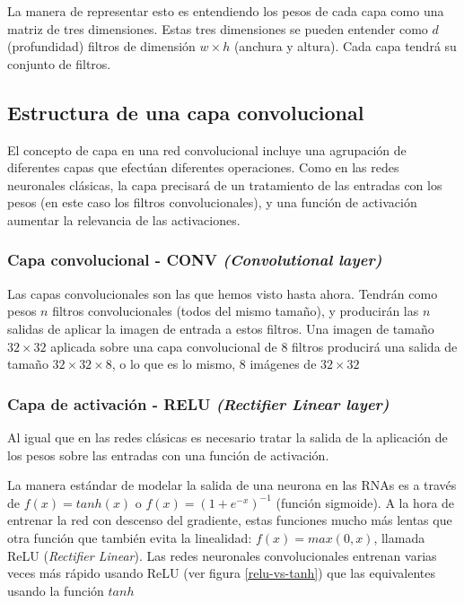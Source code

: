 La manera de representar esto es entendiendo los pesos de cada capa como una matriz de tres dimensiones. Estas tres dimensiones se pueden entender como $d$ (profundidad) filtros de dimensión  $w \times h$ (anchura y altura). Cada capa tendrá su conjunto de filtros.

\subsection{Estructura de una capa convolucional}

El concepto de capa en una red convolucional incluye una agrupación de diferentes capas que efectúan diferentes operaciones. Como en las redes neuronales clásicas, la capa precisará de un tratamiento de las entradas con los pesos (en este caso los filtros convolucionales), y una función de activación aumentar la relevancia de las activaciones. 

\subsubsection{Capa convolucional - CONV \textit{(Convolutional layer)}}

Las capas convolucionales son las que hemos visto hasta ahora. Tendrán como pesos $n$ filtros convolucionales (todos del mismo tamaño), y producirán las $n$ salidas de aplicar la imagen de entrada a estos filtros. Una imagen de tamaño $32\times 32$ aplicada sobre una capa convolucional de 8 filtros producirá una salida de tamaño $32 \times 32 \times 8$, o lo que es lo mismo, 8 imágenes de $32 \times 32$

\subsubsection{Capa de activación - RELU \textit{(Rectifier Linear layer)}}

Al igual que en las redes clásicas es necesario tratar la salida de la aplicación de los pesos sobre las entradas con una función de activación. 

La manera estándar de modelar la salida de una neurona en las RNAs es a través de $f(x) = tanh(x)$ o $f(x) = (1 + e^{-x})^{-1}$ (función sigmoide). A la hora de entrenar la red con descenso del gradiente, estas funciones mucho más lentas que otra función que también evita la linealidad: $f(x) = max(0, x)$, llamada ReLU (\textit{Rectifier Linear}). Las redes neuronales convolucionales entrenan varias veces más rápido usando ReLU (ver figura \ref{relu-vs-tanh}) que las equivalentes usando la función $tanh$ \parencite{krizhevsky2012imagenet}


